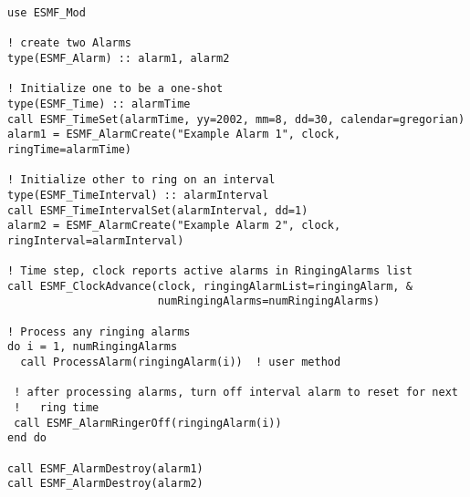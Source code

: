 
\begin{verbatim}
use ESMF_Mod

! create two Alarms
type(ESMF_Alarm) :: alarm1, alarm2

! Initialize one to be a one-shot
type(ESMF_Time) :: alarmTime
call ESMF_TimeSet(alarmTime, yy=2002, mm=8, dd=30, calendar=gregorian)
alarm1 = ESMF_AlarmCreate("Example Alarm 1", clock, ringTime=alarmTime)

! Initialize other to ring on an interval
type(ESMF_TimeInterval) :: alarmInterval
call ESMF_TimeIntervalSet(alarmInterval, dd=1)
alarm2 = ESMF_AlarmCreate("Example Alarm 2", clock, ringInterval=alarmInterval)

! Time step, clock reports active alarms in RingingAlarms list
call ESMF_ClockAdvance(clock, ringingAlarmList=ringingAlarm, &
                       numRingingAlarms=numRingingAlarms)

! Process any ringing alarms
do i = 1, numRingingAlarms
  call ProcessAlarm(ringingAlarm(i))  ! user method

 ! after processing alarms, turn off interval alarm to reset for next
 !   ring time
 call ESMF_AlarmRingerOff(ringingAlarm(i))
end do

call ESMF_AlarmDestroy(alarm1)
call ESMF_AlarmDestroy(alarm2)
\end{verbatim}
